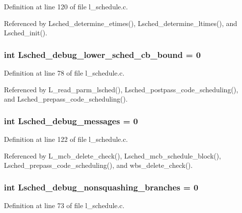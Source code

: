 Definition at line 120 of file l\_\-schedule.c.

Referenced by Lsched\_\-determine\_\-etimes(), Lsched\_\-determine\_\-ltimes(), and Lsched\_\-init().
\subsubsection{\setlength{\rightskip}{0pt plus 5cm}int \bf{Lsched\_\-debug\_\-lower\_\-sched\_\-cb\_\-bound} = 0}\label{l__schedule_8c_3b4f7a21cbaf1b8ed78ae395b1f610b5}




Definition at line 78 of file l\_\-schedule.c.

Referenced by L\_\-read\_\-parm\_\-lsched(), Lsched\_\-postpass\_\-code\_\-scheduling(), and Lsched\_\-prepass\_\-code\_\-scheduling().
\subsubsection{\setlength{\rightskip}{0pt plus 5cm}int \bf{Lsched\_\-debug\_\-messages} = 0}\label{l__schedule_8c_69b188aa5e7ffe9ebe9d25ada889bb4f}




Definition at line 122 of file l\_\-schedule.c.

Referenced by L\_\-mcb\_\-delete\_\-check(), Lsched\_\-mcb\_\-schedule\_\-block(), Lsched\_\-prepass\_\-code\_\-scheduling(), and wbs\_\-delete\_\-check().
\subsubsection{\setlength{\rightskip}{0pt plus 5cm}int \bf{Lsched\_\-debug\_\-nonsquashing\_\-branches} = 0}\label{l__schedule_8c_9ee6e81eaa3a35d7523b7d81f38cdbc8}




Definition at line 73 of file l\_\-schedule.c.

